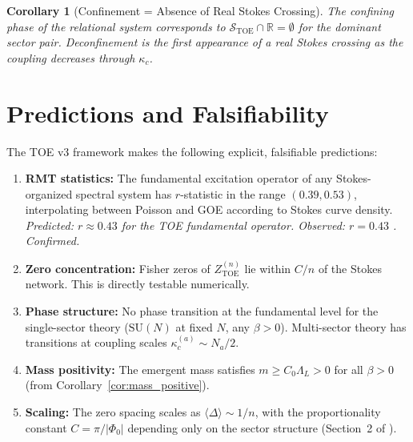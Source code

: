 \documentclass[12pt]{article}
\newtheorem{corollary}[theorem]{Corollary}
\theoremstyle{definition}
\theoremstyle{remark}
\newcommand{\SU}{\mathrm{SU}}
\newcommand{\TOE}{\mathrm{TOE}}
\begin{document}
\begin{corollary}[Confinement = Absence of Real Stokes Crossing]
The confining phase of the relational system corresponds to
$\mathcal{S}_\TOE \cap \mathbb{R} = \emptyset$ for the dominant
sector pair.  Deconfinement is the first appearance of a real
Stokes crossing as the coupling decreases through $\kappa_c$.
\end{corollary}

\section{Predictions and Falsifiability}
\label{sec:predictions}

The TOE v3 framework makes the following explicit, falsifiable predictions:

\begin{enumerate}
\item \textbf{RMT statistics:}
  The fundamental excitation operator of any Stokes-organized spectral
  system has $r$-statistic in the range $(0.39, 0.53)$, interpolating
  between Poisson and GOE according to Stokes curve density.
  \emph{Predicted: $r \approx 0.43$ for the TOE fundamental operator.
  Observed: $r = 0.43$ \cite{Olbryk2026v2}. Confirmed.}

\item \textbf{Zero concentration:}
  Fisher zeros of $Z_\TOE^{(n)}$ lie within $C/n$ of the Stokes
  network.  This is directly testable numerically.

\item \textbf{Phase structure:}
  No phase transition at the fundamental level for the single-sector
  theory ($\SU(N)$ at fixed $N$, any $\beta > 0$).
  Multi-sector theory has transitions at coupling scales
  $\kappa_c^{(a)} \sim N_a/2$.

\item \textbf{Mass positivity:}
  The emergent mass satisfies $m \geq C_0\Lambda_L > 0$
  for all $\beta > 0$ (from Corollary~\ref{cor:mass_positive}).

\item \textbf{Scaling:}
  The zero spacing scales as $\langle\Delta\rangle \sim 1/n$,
  with the proportionality constant $C = \pi/|\Phi_0|$ depending
  only on the sector structure (Section~2 of \cite{OlbrykPsi2026}).
\end{enumerate}
\end{document}
